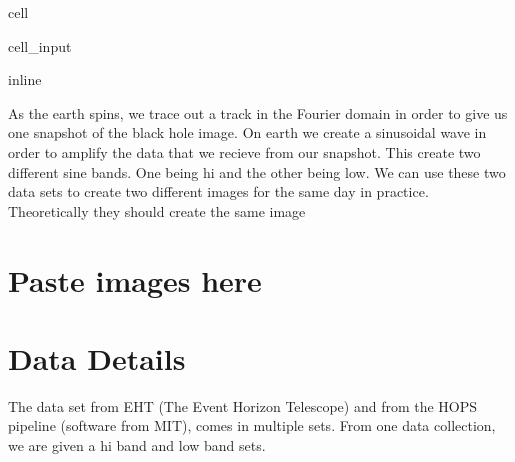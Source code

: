 \documentclass[letterpaper,10pt,english]{jupyterBook}
\begin{document}
\begin{sphinxuseclass}{cell}\begin{sphinxVerbatimInput}

\begin{sphinxuseclass}{cell_input}
\begin{sphinxVerbatim}[commandchars=\\\{\}]
   
   
 
 
    
     
   
   
 
 inline
\end{sphinxVerbatim}

\end{sphinxuseclass}\end{sphinxVerbatimInput}

\end{sphinxuseclass}
\sphinxAtStartPar
As the earth spins, we trace out a track in the Fourier domain in order to give us one snapshot of the black hole image. On earth we create a sinusoidal wave in order to amplify the data that we recieve from our snapshot. This create two different sine bands. One being hi and the other being low. We can use these two data sets to create two different images for the same day in practice. Theoretically they should create the same image


\section{Paste images here}
\label{\detokenize{data:paste-images-here}}

\section{Data Details}
\label{\detokenize{data:data-details}}
\sphinxAtStartPar
The data set from EHT (The Event Horizon Telescope) and from the HOPS pipeline (software from MIT), comes in multiple sets. From one data collection, we are given a hi band and low band sets.
\end{document}
